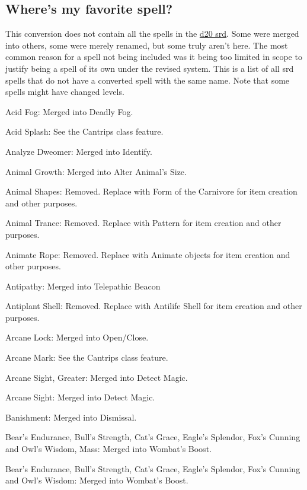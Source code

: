 \newpage
\subsection{Where's my favorite spell?}
\label{sec:MissingSpells}
This conversion does not contain all the spells in the \href{http://www.wizards.com/default.asp?x=d20/article/srd35}{d20 srd}.
Some were merged into others, some were merely renamed, but some truly aren't here. 
The most common reason for a spell not being included was it being too limited in scope to justify being a spell of its own under the revised system.
This is a list of all srd spells that do not have a converted spell with the same name.
Note that some spells might have changed levels.
{\small
\begin{list}{}{\leftmargin=1em}
 \item Acid Fog: Merged into Deadly Fog.
 \item Acid Splash: See the Cantrips class feature.
 \item Analyze Dweomer: Merged into Identify.
 \item Animal Growth: Merged into Alter Animal's Size.
 \item Animal Shapes: Removed. Replace with Form of the Carnivore for item creation and other purposes.
 \item Animal Trance: Removed. Replace with Pattern for item creation and other purposes.
 \item Animate Rope: Removed. Replace with Animate objects for item creation and other purposes.
 \item Antipathy: Merged into Telepathic Beacon
 \item Antiplant Shell: Removed. Replace with Antilife Shell for item creation and other purposes.
 \item Arcane Lock: Merged into Open/Close.
 \item Arcane Mark: See the Cantrips class feature.
 \item Arcane Sight, Greater: Merged into Detect Magic.
 \item Arcane Sight: Merged into Detect Magic.
 \item Banishment: Merged into Dismissal.
 \item Bear's Endurance, Bull's Strength, Cat's Grace, Eagle's Splendor, Fox's Cunning and Owl's Wisdom, Mass: Merged into Wombat's Boost.
 \item Bear's Endurance, Bull's Strength, Cat's Grace, Eagle's Splendor, Fox's Cunning and Owl's Wisdom: Merged into Wombat's Boost.

\end{list}}
